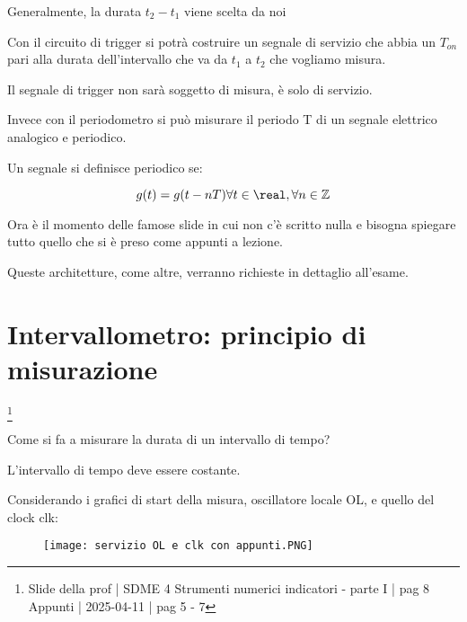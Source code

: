 \begin{tcolorbox}
    Generalmente, la durata $t_2 - t_1$ viene scelta da noi    
\end{tcolorbox}

Con il circuito di trigger si potrà costruire un segnale di servizio che abbia un $T_{on}$ pari alla durata dell'intervallo che va da $t_1$ a $t_2$ che vogliamo misura. \newline 

Il segnale di trigger non sarà soggetto di misura, è solo di servizio. \newline 

Invece con il periodometro si può misurare il periodo T di un segnale elettrico analogico e periodico. \newline 

Un segnale si definisce periodico se: 

{
    \Large 
    \begin{equation}
        g(t) = g(t- n T) \forall t \in \real, \forall n \in \mathbb{Z} 
    \end{equation}
}

\newpage 


\begin{tcolorbox}
    Ora è il momento delle famose slide in cui non c'è scritto nulla e bisogna spiegare tutto quello che si è preso come appunti a lezione. \newline 
    
    Queste architetture, come altre, verranno richieste in dettaglio all'esame. 
\end{tcolorbox}

\section{Intervallometro: principio di misurazione}
\footnote{Slide della prof | SDME 4 Strumenti numerici indicatori - parte I | pag 8 \\  
Appunti | 2025-04-11 | pag 5 - 7}

Come si fa a misurare la durata di un intervallo di tempo? \newline 

L'intervallo di tempo deve essere costante. \newline 

Considerando i grafici di start della misura, oscillatore locale OL, e quello del clock clk: 

\begin{figure}[h]
    \centering
    \texttt{[image: servizio OL e clk con appunti.PNG]}
\end{figure}

